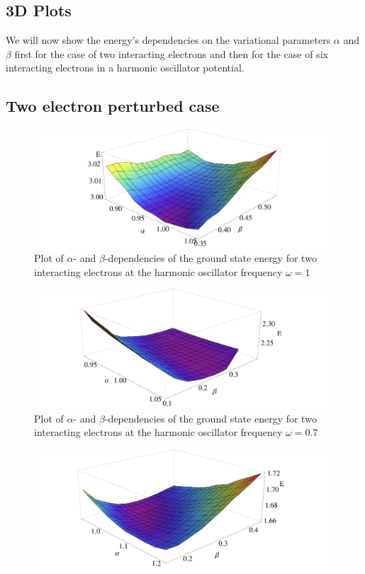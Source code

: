 \begin{appendix}
\section{3D Plots}\label{sec:appendix}
We will now show the energy's dependencies on the variational parameters $\alpha$ and $\beta$ first for the case of two interacting electrons and then for the case of six interacting electrons in a harmonic oscillator potential.
\subsection{Two electron perturbed case}
\begin{figure}
    \centering
    \includegraphics[scale=0.36]{ptwo1}
    \caption{Plot of $\alpha$- and $\beta$-dependencies of the ground state energy for two interacting electrons at the harmonic oscillator frequency $\omega=1$}
    \label{fig:ptwo1}
\end{figure}
\begin{figure}
    \centering
    \includegraphics[scale=0.36]{ptwo07}
    \caption{Plot of $\alpha$- and $\beta$-dependencies of the ground state energy for two interacting electrons at the harmonic oscillator frequency $\omega=0.7$}
    \label{fig:ptwo07}
\end{figure}
\begin{figure}
    \centering
    \includegraphics[scale=0.36]{ptwo05}

\end{figure}
\end{appendix}
